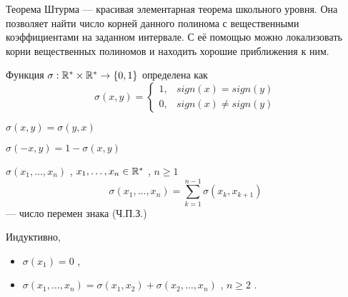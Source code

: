 



    
\SScover
    

Теорема Штурма --- красивая элементарная теорема школьного уровня. Она позволяет найти число корней данного полинома с вещественными коэффициентами на заданном интервале.
С её помощью можно локализовать корни вещественных полиномов и находить хорошие приближения к ним.

\vspace

\SSbullet 


\SSsect[def] Функция \( \sigma: \mathbb{R}^* \times \mathbb{R}^* \rightarrow \{0,1\} \) определена как
\[ \sigma(x,y) = 
   \begin{cases} 
       1, & sign(x) = sign(y) \\ 
       0, & sign(x) \neq sign(y)
   \end{cases} 
\]

\SSsect \( \sigma(x,y) = \sigma(y,x) \)

\SSsect \( \sigma(-x,y) = 1 - \sigma(x,y) \)

\SSsect[def] \( \sigma(x_1,\dots,x_n) \) , \( x_1,\dots,x_n \in \mathbb{R}^* \) , \( n \geqslant 1 \)
\[ \sigma(x_1,\dots,x_n) = \sum_{k=1}^{n-1} \sigma(x_k,x_{k+1})
\]
--- число перемен знака (Ч.П.З.)

\SSsect Индуктивно,
\begin{itemize}[label=]
\item \( \sigma(x_1) = 0 \) ,
\item \( \sigma(x_1,\dots,x_n) = \sigma(x_1,x_2) + \sigma(x_2,\dots,x_n) \) , \( n \geqslant 2 \) .
\end{itemize}

\vspace

